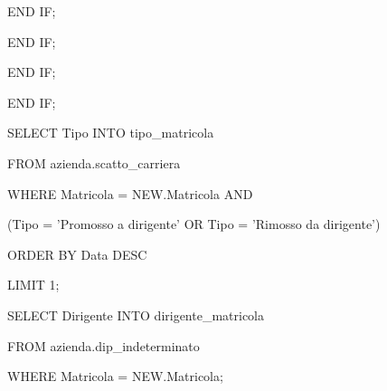 \begin{flushleft}
\begin{description}
\begin{description}
\begin{description}
\begin {description}
\begin{description}
\begin{description}
                                    \end{description}
                                    \item END IF;
                                \end{description}
                                \item END IF;
                            \end{description}
                            \item END IF;
                        \end{description}
                        \item END IF;
                        
                        \vspace{0.5cm}

                        \item SELECT Tipo INTO tipo\_matricola 
                        \item FROM azienda.scatto\_carriera
                        \item WHERE Matricola = NEW.Matricola AND 
                        \item (Tipo = 'Promosso a dirigente' OR Tipo = 'Rimosso da dirigente')
                        \item ORDER BY Data DESC
                        \item LIMIT 1;

                        \vspace{0.5cm}

                        \item SELECT Dirigente INTO dirigente\_matricola 
                        \item FROM azienda.dip\_indeterminato
                        \item WHERE Matricola = NEW.Matricola;

                        \vspace{0.5cm}


\end{description}
\end{description}
\end{flushleft}
